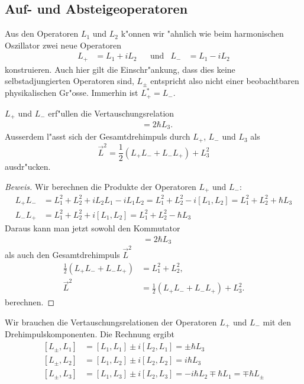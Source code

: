 \subsection{Auf- und Absteigeoperatoren}
%
%
Aus den Operatoren $L_1$ und $L_2$ k"onnen wir "ahnlich wie beim
harmonischen Oszillator zwei neue Operatoren
\begin{align*}
L_+&=L_1+iL_2
&
&\text{und}&
L_-&=L_1-iL_2
\end{align*}
konstruieren.
Auch hier gilt die Einschr"ankung, dass dies keine selbstadjungierten
Operatoren sind, $L_\pm$ entspricht also nicht einer beobachtbaren
physikalischen Gr"osse. 
Immerhin ist $L_+^*=L_-$.

\begin{hilfssatz}
$L_+$ und $L_-$ erf"ullen die Vertauschungsrelation
\begin{align*}
[L_+, L_-]&=2\hbar L_3.
\end{align*}
Ausserdem l"asst sich der Gesamtdrehimpuls durch $L_+$, $L_-$ und $L_3$ als
\[
\vec L^2 = \frac12(L_+L_- + L_-L_+)+L_3^2
\]
ausdr"ucken.
\end{hilfssatz}

\begin{proof}[Beweis]
Wir berechnen die Produkte der Operatoren $L_+$ und $L_-$:
\begin{align}
L_+L_-
&=
L_1^2+L_2^2 +iL_2L_1-iL_1L_2=L_1^2+L_2^2 -i[L_1,L_2]=L_1^2+L_2^2+\hbar L_3
\label{skript:l+l-}
\\
L_-L_+
&=
L_1^2  + L_2^2 +i[L_1,L_2]=L_1^2+L_2^2-\hbar L_3
\label{skript:l-l+}
\end{align}
Daraus kann man jetzt sowohl den Kommutator
\begin{align*}
[L_+,L_-]
&=
2\hbar L_3
\end{align*}
als auch den Gesamtdrehimpuls $\vec L^2$
\begin{align*}
{\textstyle \frac12}(L_+L_-+L_-L_+)&=L_1^2+L_2^2,
\\
\vec L^2
&=
{\textstyle\frac12}(L_+L_-+L_-L_+)+L_3^2.
\end{align*}
berechnen.
\end{proof}

Wir brauchen die Vertauschungsrelationen der Operatoren $L_+$ und $L_-$
mit den Drehimpulskomponenten.
Die Rechnung ergibt
\begin{equation}
\begin{aligned} 
\phantom{ }	%
[L_\pm, L_1]
&=
[L_1,L_1]\pm i[L_2,L_1]
=
\pm \hbar L_3
\\
[L_\pm, L_2]
&=
[L_1,L_2]\pm i[L_2,L_2]
=
i\hbar L_3
\\
[L_\pm,L_3]
&=
[L_1,L_3]\pm i[L_2,L_3]
=
-i\hbar L_2
\mp
\hbar L_1
=
\mp \hbar L_\pm
\end{aligned}
\label{skript:lpmlkommutator}
\end{equation}

